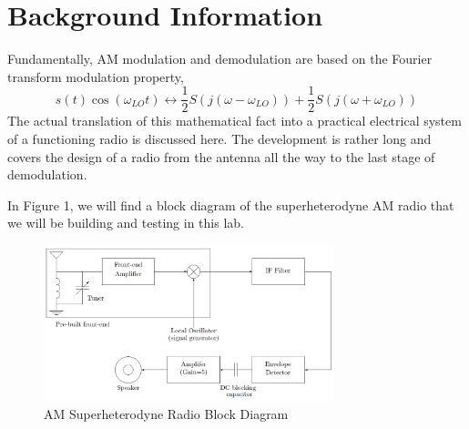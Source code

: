 \documentclass[utf8]{article}
\begin{document}
\section{Background Information}
Fundamentally, AM modulation and demodulation are based on the Fourier transform modulation property, $$ s(t)\cos(\omega_{LO}t)\leftrightarrow \frac{1}{2}S(j(\omega-\omega_{LO}))+\frac{1}{2}S(j(\omega+\omega_{LO})) $$
The actual translation of this mathematical fact into a practical electrical system of a functioning radio is discussed here. The development is rather long and covers the design of a radio from the antenna all the way to the last stage of demodulation.

In Figure 1, we will find a block diagram of the superheterodyne AM radio that we will be building and testing in this lab.

\begin{figure}[H]
	\begin{small}
		\begin{center}
			\includegraphics[width=0.75\textwidth]{figures/Figure1.png}
		\end{center}
		\caption{AM Superheterodyne Radio Block Diagram}
		\label{fig:fig1}
	\end{small}
\end{figure}
\end{document}
